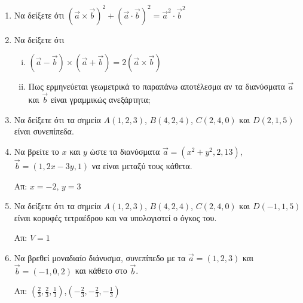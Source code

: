 \begin{enumerate}[itemsep=0.7\baselineskip]
  \item Να δείξετε ότι $ (\vec{a}\times \vec{b})^{2} + (\vec{a}\cdot \vec{b})^{2} =
    \vec{a}^{2}\cdot \vec{b}^{2} $  

  \item Να δείξετε ότι
    \begin{enumerate}[i)]
      \item $ ( \vec{a} - \vec{b} ) \times ( \vec{a} + \vec{b} ) = 2 (\vec{a} \times 
        \vec{b}) $
      \item Πως ερμηνεύεται γεωμετρικά το παραπάνω αποτέλεσμα αν τα διανύσματα 
        $ \vec{a} $ και $ \vec{b} $ είναι γραμμικώς ανεξάρτητα;
    \end{enumerate}


  \item Να δείξετε ότι τα σημεία $ A(1,2,3)$, $B(4,2,4)$, $C(2,4,0) $ και $ D(2,1,5) $ 
    είναι συνεπίπεδα.

  \item Να βρείτε το $x$ και $y$ ώστε τα διανύσματα $ \vec{a} = (x^{2}+y^{2},2,13) $, 
    $ \vec{b} = (1,2x-3y,1) $ να είναι μεταξύ τους κάθετα. 

    \hfill Απ: $ x=-2 $, $ y=3 $

  \item Να δείξετε ότι τα σημεία $ A(1,2,3) $, $ B(4,2,4) $, $ C(2,4,0) $ και 
    $ D(-1,1,5) $ είναι κορυφές τετραέδρου και να υπολογιστεί ο όγκος του.

    \hfill Απ: $ V=1 $

  \item Να βρεθεί μοναδιαίο διάνυσμα, συνεπίπεδο με τα $ \vec{a} = (1,2,3) $ και 
    $ \vec{b} = (-1,0,2) $ και κάθετο στο $ \vec{b} $.

    \hfill Απ: $ (\frac{2}{3}, \frac{2}{3}, \frac{1}{3}) $,$ (-\frac{2}{3},- 
    \frac{2}{3}, -\frac{1}{3})$  
\end{enumerate}



